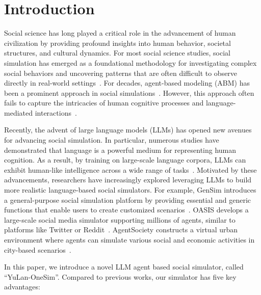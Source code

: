 \documentclass{article}
\theoremstyle{definition}
\theoremstyle{theorem}
\theoremstyle{proof}
\theoremstyle{remark}
\begin{document}
	\setcounter{footnote}{0}
	\setcounter{tocdepth}{4}
	\clearpage
	\tableofcontents
	\clearpage
	
	
	
    \setlength{\epigraphwidth}{.98\textwidth}
	
    \section{Introduction}
    Social science has long played a critical role in the advancement of human civilization by providing profound insights into human behavior, societal structures, and cultural dynamics. For most social science studies, social simulation has emerged as a foundational methodology for investigating complex social behaviors and uncovering patterns that are often difficult to observe directly in real-world settings~\cite{squazzoni2014social}. 
    For decades, agent-based modeling (ABM) has been a prominent approach in social simulations~{\cite{heath2009survey,bianchi2015agent}}. However, this approach often fails to capture the intricacies of human cognitive processes and language-mediated interactions~{\cite{gao2024large}}.

    Recently, the advent of large language models (LLMs) has opened new avenues for advancing social simulation. 
    In particular, numerous studies have demonstrated that language is a powerful medium for representing human cognition. 
    As a result, by training on large-scale language corpora, LLMs can exhibit human-like intelligence across a wide range of tasks~{\cite{zhao2023survey,achiam2023gpt}}.     
    Motivated by these advancements, researchers have increasingly explored leveraging LLMs to build more realistic language-based social simulators. For example, GenSim introduces a general-purpose social simulation platform by providing essential and generic functions that enable users to create customized scenarios~\cite{gensim}.
    OASIS develops a large-scale social media simulator supporting millions of agents, similar to platforms like Twitter or Reddit~\cite{oasis}. 
    AgentSociety constructs a virtual urban environment where agents can simulate various social and economic activities in city-based scenarios~\cite{agentsociety}. 

    In this paper, we introduce a novel LLM agent based social simulator, called ``YuLan-OneSim''.
    Compared to previous works, our simulator has five key advantages:
\end{document}
